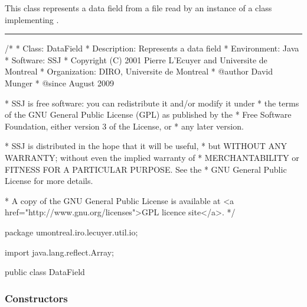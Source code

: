 
This class represents a data field from a file read by an instance of a class
 implementing .

\bigskip\hrule

\begin{code}
\begin{hide}
/*
 * Class:        DataField
 * Description:  Represents a data field
 * Environment:  Java
 * Software:     SSJ 
 * Copyright (C) 2001  Pierre L'Ecuyer and Universite de Montreal
 * Organization: DIRO, Universite de Montreal
 * @author       David Munger 
 * @since        August 2009

 * SSJ is free software: you can redistribute it and/or modify it under
 * the terms of the GNU General Public License (GPL) as published by the
 * Free Software Foundation, either version 3 of the License, or
 * any later version.

 * SSJ is distributed in the hope that it will be useful,
 * but WITHOUT ANY WARRANTY; without even the implied warranty of
 * MERCHANTABILITY or FITNESS FOR A PARTICULAR PURPOSE.  See the
 * GNU General Public License for more details.

 * A copy of the GNU General Public License is available at
   <a href="http://www.gnu.org/licenses">GPL licence site</a>.
 */
\end{hide}
package umontreal.iro.lecuyer.util.io;
\begin{hide}
import java.lang.reflect.Array;
\end{hide}

public class DataField \begin{hide} {
   protected String label;
   protected Object data;
   protected int effectiveLength;
\end{hide}
\end{code}

\subsubsection*{Constructors}


